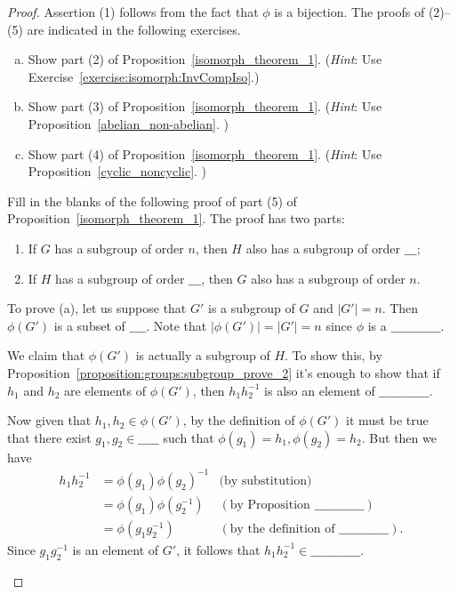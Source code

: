 \begin{proof}
Assertion (1) follows from the fact that $\phi$ is a bijection.  The proofs of (2)--(5) are indicated in the following exercises.

\begin{exercise}
\begin{enumerate}[(a)]
\item 
Show part (2) of Proposition~\ref{isomorph_theorem_1}. (\emph{Hint}: Use Exercise~\ref{exercise:isomorph:InvCompIso}.)
\item
Show part (3) of Proposition~\ref{isomorph_theorem_1}. (\emph{Hint}: Use Proposition~\ref{abelian_non-abelian}. )
\item
Show part (4) of Proposition~\ref{isomorph_theorem_1}. (\emph{Hint}: Use Proposition~\ref{cyclic_noncyclic}. )
\end{enumerate}
\end{exercise} 

\begin{exercise} Fill in the blanks of the following proof of part (5) of Proposition~\ref{isomorph_theorem_1}.
The proof has two parts:

\begin{enumerate}
\item
If $G$ has a subgroup of order $n$, then $H$ also has a subgroup of order $\_\_\_$;
\item
If $H$ has a subgroup of order $\_\_\_$, then $G$ also has a subgroup of order $n$.
\end{enumerate}

To prove (a), let us suppose that $G'$ is a subgroup of $G$ and $|G'| = n$. Then $\phi(G')$ is a subset of $\_\_\_\_$. Note that 
$|\phi(G')| = |G'| = n$ since $\phi$ is a $\_\_\_\_\_\_\_\_\_\_\_\_$. 

We claim that $\phi(G')$ is actually a subgroup of $H$.  To show this, by Proposition~\ref{proposition:groups:subgroup_prove_2} it's enough to show that if $h_1$ and $h_2$ are elements of  $\phi(G')$, then $h_1 h_2^{-1}$ is also an element of $\_\_\_\_\_\_\_\_\_\_\_\_$.

Now given that  $h_1, h_2 \in \phi(G')$, by the definition of $\phi(G')$ it must be true that there exist $g_1, g_2 \in \_\_\_\_\_$ such that $\phi(g_1) = h_1, \phi(g_2) = h_2$. But then we have 
\begin{align*}
h_1 h_2^{-1} &= \phi(g_1) \phi(g_2)^{-1} &\text{(by substitution)}\\
&= \phi(g_1) \phi(g_2^{-1}) &(\text{by Proposition~}\_\_\_\_\_\_\_\_\_\_\_\_)\\
&= \phi(g_1 g_2^{-1}) &(\text{by the definition of }\_\_\_\_\_\_\_\_\_\_\_\_).
\end{align*}
Since $g_1 g_2^{-1}$ is an element of $G'$, it follows that $h_1 h_2^{-1} \in \_\_\_\_\_\_\_\_\_\_\_\_$.
\medskip


\end{exercise}
\end{proof}
